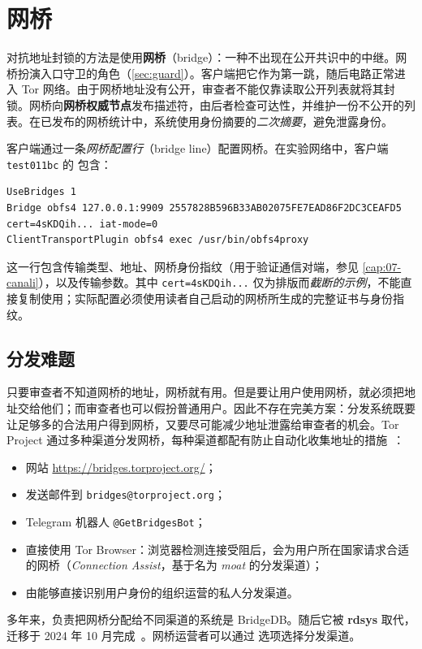 \section{网桥}\label{sec:cens-bridge}

对抗地址封锁的方法是使用\textbf{网桥}（bridge）：一种不出现在公开共识中的中继。网桥扮演入口守卫的角色（\cref{sec:guard}）。客户端把它作为第一跳，随后电路正常进入 Tor 网络。由于网桥地址没有公开，审查者不能仅靠读取公开列表就将其封锁。网桥向\textbf{网桥权威节点}发布描述符，由后者检查可达性，并维护一份不公开的列表。在已发布的网桥统计中，系统使用身份摘要的\emph{二次摘要}，避免泄露身份。

客户端通过一条\emph{网桥配置行}（bridge line）配置网桥。在实验网络中，客户端 \texttt{test011bc} 的  包含：
\begin{lstlisting}[language=torrc,numbers=none]
UseBridges 1
Bridge obfs4 127.0.0.1:9909 2557828B596B33AB02075FE7EAD86F2DC3CEAFD5 cert=4sKDQih... iat-mode=0
ClientTransportPlugin obfs4 exec /usr/bin/obfs4proxy
\end{lstlisting}
这一行包含传输类型、地址、网桥身份指纹（用于验证通信对端，参见 \cref{cap:07-canali}），以及传输参数。其中 \texttt{cert=4sKDQih...} 仅为排版而\emph{截断的示例}，不能直接复制使用；实际配置必须使用读者自己启动的网桥所生成的完整证书与身份指纹。

\subsection{分发难题}

只要审查者不知道网桥的地址，网桥就有用。但是要让用户使用网桥，就必须把地址交给他们；而审查者也可以假扮普通用户。因此不存在完美方案：分发系统既要让足够多的合法用户得到网桥，又要尽可能减少地址泄露给审查者的机会。Tor Project 通过多种渠道分发网桥，每种渠道都配有防止自动化收集地址的措施~\cite{torsupport}：
\begin{itemize}
  \item 网站 \url{https://bridges.torproject.org/}；
  \item 发送邮件到 \texttt{bridges@torproject.org}；
  \item Telegram 机器人 \texttt{@GetBridgesBot}；
  \item 直接使用 Tor Browser：浏览器检测连接受阻后，会为用户所在国家请求合适的网桥（\emph{Connection Assist}，基于名为 \emph{moat} 的分发渠道）；
  \item 由能够直接识别用户身份的组织运营的私人分发渠道。
\end{itemize}
多年来，负责把网桥分配给不同渠道的系统是 BridgeDB。随后它被 \textbf{rdsys} 取代，迁移于 2024 年 10 月完成~\cite{torblogrdsys}。网桥运营者可以通过  选项选择分发渠道。

